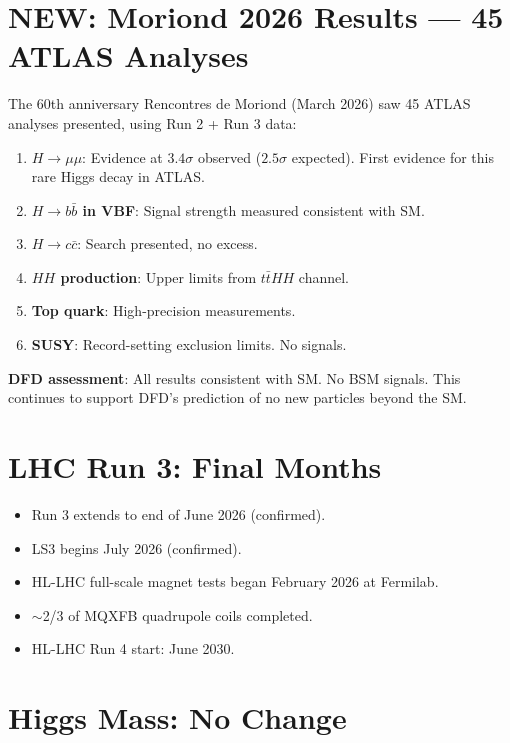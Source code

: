 \documentclass[11pt,a4paper]{article}
\newcommand{\NEW}{\textcolor{dfdblue}{\textbf{NEW}}}
\begin{document}
\section{\NEW: Moriond 2026 Results --- 45 ATLAS Analyses}

\begin{tcolorbox}[colback=blue!5!white, colframe=blue!60!black,
  title={ATLAS Moriond 2026: Major Conference Debut}]

The 60th anniversary Rencontres de Moriond (March 2026) saw 45 ATLAS analyses presented, using Run 2 + Run 3 data:

\begin{enumerate}
\item \textbf{$H \to \mu\mu$}: Evidence at $3.4\sigma$ observed ($2.5\sigma$ expected). First evidence for this rare Higgs decay in ATLAS.
\item \textbf{$H \to b\bar{b}$ in VBF}: Signal strength measured consistent with SM.
\item \textbf{$H \to c\bar{c}$}: Search presented, no excess.
\item \textbf{$HH$ production}: Upper limits from $t\bar{t}HH$ channel.
\item \textbf{Top quark}: High-precision measurements.
\item \textbf{SUSY}: Record-setting exclusion limits. No signals.
\end{enumerate}

\textbf{DFD assessment}: All results consistent with SM. No BSM signals. This continues to support DFD's prediction of no new particles beyond the SM.
\end{tcolorbox}

\section{LHC Run 3: Final Months}

\begin{itemize}
\item Run 3 extends to end of June 2026 (confirmed).
\item LS3 begins July 2026 (confirmed).
\item HL-LHC full-scale magnet tests began February 2026 at Fermilab.
\item $\sim$2/3 of MQXFB quadrupole coils completed.
\item HL-LHC Run 4 start: June 2030.
\end{itemize}

\section{Higgs Mass: No Change}
\end{document}

